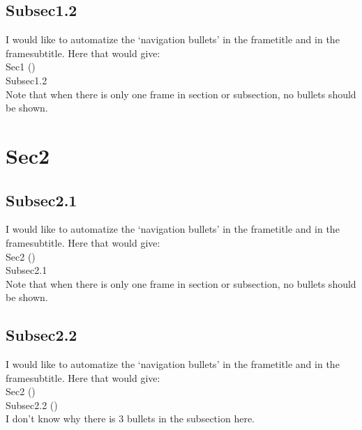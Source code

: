 \documentclass{beamer}
\begin{document}
\subsection{Subsec1.2}

\begin{frame}
   I would like to automatize the `navigation bullets' in the frametitle and in the framesubtitle. Here that would give:\\[5mm]
   Sec1 (\textbullet\textbullet\textbullet\textbullet\textbullet)\\
   Subsec1.2\\[5mm]
   \color{red}Note that when there is only one frame in section or subsection, no bullets should be shown.
\end{frame}

\section{Sec2}

\subsection{Subsec2.1}

\begin{frame}
   I would like to automatize the `navigation bullets' in the frametitle and in the framesubtitle. Here that would give:\\[5mm]
   Sec2 (\textbullet\textopenbullet\textopenbullet)\\
   Subsec2.1\\[5mm]
   \color{red}Note that when there is only one frame in section or subsection, no bullets should be shown.
\end{frame}

\subsection{Subsec2.2}

\begin{frame}
   I would like to automatize the `navigation bullets' in the frametitle and in the framesubtitle. Here that would give:\\[5mm]
   Sec2 (\textbullet\textbullet\textopenbullet)\\
   Subsec2.2 (\textbullet\textopenbullet)\\[5mm]

   \color{red}I don't know why there is 3 bullets in the subsection here.
\end{frame}
\end{document}
